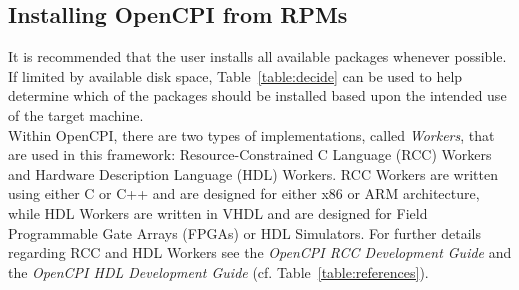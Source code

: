 \subsection{Installing OpenCPI from RPMs}
\label{sec:install_av_rpm}
It is recommended that the user installs all available packages whenever possible. If limited by available disk space, Table~\ref{table:decide} can be used to help determine which of the packages should be installed based upon the intended use of the target machine.\\

Within OpenCPI, there are two types of implementations, called \textit{Workers}, that are used in this framework: Resource-Constrained C Language (RCC) Workers and Hardware Description Language (HDL) Workers. RCC Workers are written using either C or C++ and are designed for either x86 or ARM architecture, while HDL Workers are written in VHDL and are designed for Field Programmable Gate Arrays (FPGAs) or HDL Simulators. For further details regarding RCC and HDL Workers see the \textit{OpenCPI RCC Development Guide} and the \textit{OpenCPI HDL Development Guide} (cf. Table~\ref{table:references}).
